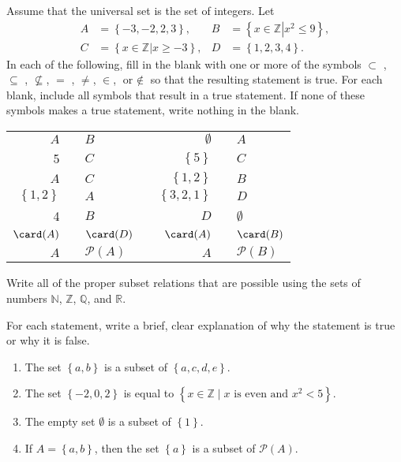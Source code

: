 \begin{enumerate}
\xitem Assume that the universal set is the set of integers. Let \label{exer:sec41-3}
\begin{align*}
A &= \left\{ { - 3, - 2,2,3} \right\}\!,  &	B &= \left\{ {x \in \mathbb{Z}\left.  \right|x^2  \leq 9} \right\}\!, \\
C &= \left\{ {\left. {x \in \mathbb{Z}} \right|x \geq  - 3} \right\}\!,  &	D &= \left\{ {1,2,3,4} \right\}\!.
\end{align*}
In each of the following, fill in the blank with one or more of the symbols  $ \subset$ , $\subseteq$ , $\not \subseteq$,  $=$ , $\ne$, $\in$, $\text{or } \notin $ so that the resulting statement is true.  For each blank, include all symbols that result in a true statement.  If none of these symbols makes a true statement, write nothing in the blank.
\begin{center}
\begin{tabular}{r p{0.6in} l p{0.3in} r p{0.6in} l }
  $A$   &   & $B$   &   & $\emptyset$   &   & $A$ \\ \cline{2-2} \cline{6-6}
   5    &   & $C$   &   &  $\left\{ 5 \right\}$  & &  $C$ \\ \cline{2-2} \cline{6-6}
  $A$   &   & $C$   &   &  $\left\{ {1,2} \right\}$  &  &  $B$ \\ \cline{2-2} \cline{6-6}
  $\left\{ {1,2} \right\}$ &  &  $A$ &  &  $\left\{ {3,2,1} \right\}$ & & $D$ \\ \cline{2-2} \cline{6-6}
  4     &  &  $B$ &  &  $D$  &  & $\emptyset$ \\ \cline{2-2} \cline{6-6}
  $\card(A)$ &  &  $\card(D)$  &  &  $\card(A)$ &  &  $\card(B)$  \\ \cline{2-2} \cline{6-6}
  $A$  &  &  $\mathcal{P}( A )$  &  &  $A$  &  &  $\mathcal{P}( B )$ \\ \cline{2-2} \cline{6-6}
\end{tabular}
\end{center}

\xitem Write all of the proper subset relations that are possible using the sets of numbers  $\mathbb{N}$, $\mathbb{Z}$, $\mathbb{Q}$, and $\mathbb{R}$. \label{exer:sec51-numbers}

\xitem For each statement, write a brief, clear explanation of why the statement is true or why it is false. \label{exer:sec41-5}
  \begin{enumerate}
    \item The set  $\left\{ {a,b} \right\}$ is a subset of  $\left\{ {a,c,d,e} \right\}$.
    \item The set  $\left\{ { - 2,0,2} \right\}$ is equal to  $\left\{ {x \in \mathbb{Z} \mid  
x\text{ is even  and  }x^2  < 5} \right\}$.
    \item The empty set  $\emptyset $  is a subset of   $\left\{ 1 \right\}$.
    \item If  $A = \left\{ {a,b} \right\}$, then the set  $\left\{ a \right\}$  is a subset of  $\mathcal{P}( A )$.
  \end{enumerate}



\end{enumerate}
